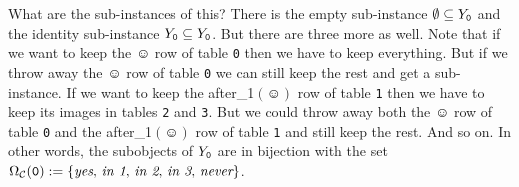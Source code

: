 \documentclass[CT4S-EN-RU]{subfiles}
\begin{document}
\begin{exampleENG}
What are the sub-instances of this? There is the empty sub-instance $\emptyset\ss Y_{\tt 0}$ and the identity sub-instance $Y_{\tt 0}\ss Y_{\tt 0}$. But there are three more as well. Note that if we want to keep the $\smiley$ row of table {\tt 0} then we have to keep everything. But if we throw away the $\smiley$ row of table {\tt 0} we can still keep the rest and get a sub-instance. If we want to keep the after\_1$(\smiley)$ row of table {\tt 1} then we have to keep its images in tables {\tt 2} and {\tt 3}. But we could throw away both the $\smiley$ row of table {\tt 0} and the after\_1$(\smiley)$ row of table {\tt 1} and still keep the rest. And so on. In other words, the subobjects of $Y_{\tt 0}$ are in bijection with the set $\Omega_\mcC({\tt 0}):=\{\tn{{\it yes}, {\it in 1}, {\it in 2}, {\it in 3}, {\it never}}\}$. 


\end{exampleENG}
\end{document}
